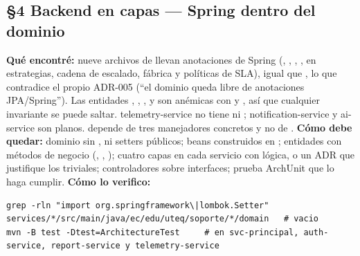 \subsection*{\S4 Backend en capas --- Spring dentro del dominio}
\textbf{Qu\'e encontr\'e:} nueve archivos de  llevan anotaciones de Spring (, , , , en estrategias, cadena de escalado, f\'abrica y pol\'iticas de SLA), igual que , lo que contradice el propio ADR-005 (``el dominio queda libre de anotaciones JPA/Spring''). Las entidades , , ,  y  son an\'emicas con  y , as\'i que cualquier invariante se puede saltar. telemetry-service no tiene  ni ; notification-service y ai-service son planos.  depende de tres manejadores concretos y no de . \textbf{C\'omo debe quedar:} dominio sin ,  ni setters p\'ublicos; beans construidos en ; entidades con m\'etodos de negocio (, , ); cuatro capas en cada servicio con l\'ogica, o un ADR que justifique los triviales; controladores sobre interfaces; prueba ArchUnit que lo haga cumplir. \textbf{C\'omo lo verifico:}\begin{verbatim}
grep -rln "import org.springframework\|lombok.Setter" services/*/src/main/java/ec/edu/uteq/soporte/*/domain   # vacio
mvn -B test -Dtest=ArchitectureTest     # en svc-principal, auth-service, report-service y telemetry-service
\end{verbatim}

